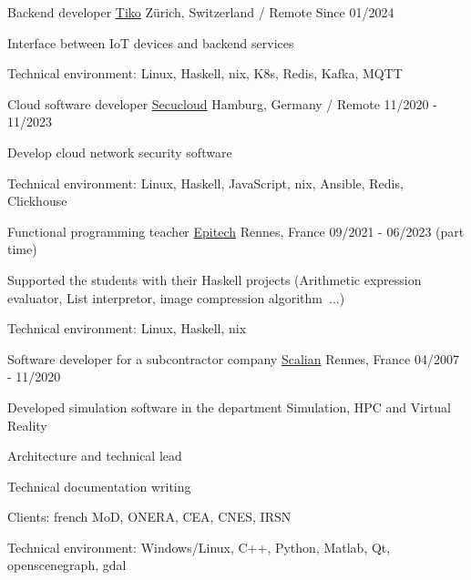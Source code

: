 \begin{cventries}
  \cventry
    {Backend developer}
    {\href{https://www.linkedin.com/company/secucloud/}{Tiko}}
    {Zürich, Switzerland / Remote}
    {Since 01/2024}
    {
      \begin{cvitems}
        \item {Interface between IoT devices and backend services}
        \item {Technical environment: Linux, Haskell, nix, K8s, Redis, Kafka, MQTT}
      \end{cvitems}
    }

  \cventry
    {Cloud software developer}
    {\href{https://www.linkedin.com/company/secucloud/}{Secucloud}}
    {Hamburg, Germany / Remote}
    {11/2020 - 11/2023}
    {
      \begin{cvitems}
        \item {Develop cloud network security software}
        \item {Technical environment: Linux, Haskell, JavaScript, nix,
            Ansible, Redis, Clickhouse}
      \end{cvitems}
    }

  \cventry
    {Functional programming teacher}
    {\href{https://www.epitech.eu/}{Epitech}}
    {Rennes, France}
    {09/2021 - 06/2023 (part time)}
    {
      \begin{cvitems}
          \item {Supported the students with their Haskell projects
              (Arithmetic expression evaluator, List interpretor, image
              compression algorithm~...)}
          \item {Technical environment: Linux, Haskell, nix}
      \end{cvitems}
    }

  \cventry
    {Software developer for a subcontractor company}
    {\href{https://www.scalian.com/}{Scalian}}
    {Rennes, France}
    {04/2007 - 11/2020}
    {
      \begin{cvitems}
        \item {Developed simulation software in the department Simulation, HPC
            and Virtual Reality}
        \item {Architecture and technical lead}
        \item {Technical documentation writing}
        \item {Clients: french MoD, ONERA, CEA, CNES, IRSN}
        \item {Technical environment: Windows/Linux, C++, Python, Matlab, Qt,
            openscenegraph, gdal}
      \end{cvitems}
    }


\end{cventries}
